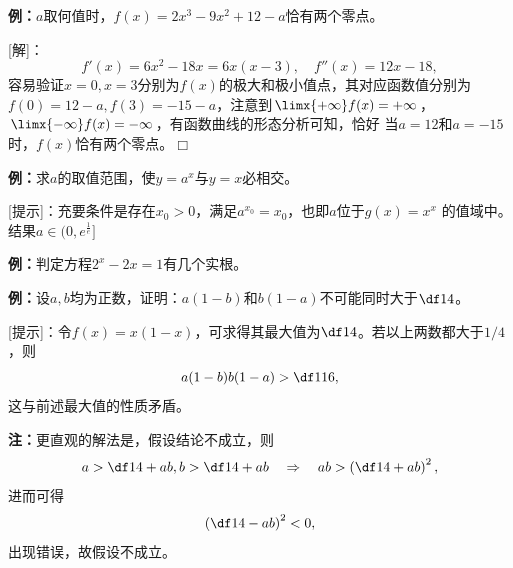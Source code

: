 {\bf 例：}$a$取何值时，$f(x)=2x^3-9x^2+12-a$恰有两个零点。

[解]：
$$f'(x)=6x^2-18x=6x(x-3),\quad 
f''(x)=12x-18,$$
容易验证$x=0,x=3$分别为$f(x)$的极大和极小值点，其对应函数值分别为
$f(0)=12-a,f(3)=-15-a$，注意到$\limx{+\infty}f(x)=+\infty$，
$\limx{-\infty}f(x)=-\infty$，有函数曲线的形态分析可知，恰好
当$a=12$和$a=-15$时，$f(x)$恰有两个零点。\hfill$\Box$

{\bf 例：}求$a$的取值范围，使$y=a^x$与$y=x$必相交。

[提示]：充要条件是存在$x_0>0$，满足$a^{x_0}=x_0$，也即$a$位于$g(x)=x^{x}$
的值域中。结果$a\in(0,e^{\frac1e}]$

{\bf 例：}判定方程$2^x-2x=1$有几个实根。

\begin{center}
\end{center}

{\bf 例：}设$a,b$均为正数，证明：$a(1-b)$和$b(1-a)$不可能同时大于$\df14$。

[提示]：令$f(x)=x(1-x)$，可求得其最大值为$\df14$。若以上两数都大于$1/4$，则
$$a(1-b)b(1-a)>\df1{16},$$
这与前述最大值的性质矛盾。

{\bf 注：}更直观的解法是，假设结论不成立，则
$$a>\df14+ab,b>\df14+ab\quad\Rightarrow\quad
ab>\left(\df14+ab\right)^2,$$
进而可得
$$\left(\df14-ab\right)^2<0,$$
出现错误，故假设不成立。

% 

